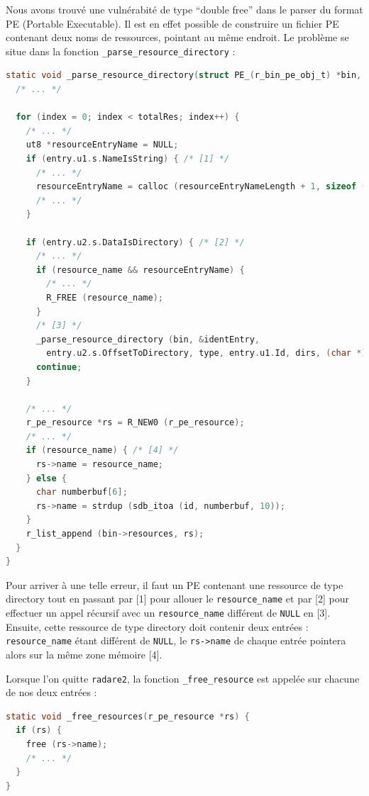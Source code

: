 Nous avons trouvé une vulnérabité de type ``double free'' dans le parser du format PE (Portable Executable). Il est en effet possible de construire un fichier PE contenant deux noms de ressources, pointant au même endroit. Le problème se situe dans la fonction \lstinline{_parse_resource_directory} :

\begin{lstlisting}[language=C]
static void _parse_resource_directory(struct PE_(r_bin_pe_obj_t) *bin, Pe_image_resource_directory *dir, ut64 offDir, int type, int id, HtUU *dirs, char *resource_name) {
  /* ... */

  for (index = 0; index < totalRes; index++) {
    /* ... */
    ut8 *resourceEntryName = NULL;
    if (entry.u1.s.NameIsString) { /* [1] */
      /* ... */
      resourceEntryName = calloc (resourceEntryNameLength + 1, sizeof (ut8));
      /* ... */
    }

    if (entry.u2.s.DataIsDirectory) { /* [2] */
      /* ... */
      if (resource_name && resourceEntryName) {
        /* ... */
        R_FREE (resource_name);
      }
      /* [3] */
      _parse_resource_directory (bin, &identEntry,
        entry.u2.s.OffsetToDirectory, type, entry.u1.Id, dirs, (char *)resourceEntryName);
      continue;
    }

    /* ... */
    r_pe_resource *rs = R_NEW0 (r_pe_resource);
    /* ... */
    if (resource_name) { /* [4] */
      rs->name = resource_name;
    } else {
      char numberbuf[6];
      rs->name = strdup (sdb_itoa (id, numberbuf, 10));
    }
    r_list_append (bin->resources, rs);
  }
}
\end{lstlisting}

Pour arriver à une telle erreur, il faut un PE contenant une ressource de type directory tout en passant par [1] pour allouer le \lstinline{resource_name} et par [2] pour effectuer un appel récursif avec un \lstinline{resource_name} différent de \lstinline{NULL} en [3].
Ensuite, cette ressource de type directory doit contenir deux entrées : \lstinline{resource_name} étant différent de \lstinline{NULL}, le \lstinline{rs->name} de chaque entrée pointera alors sur la même zone mémoire [4].

Lorsque l'on quitte \lstinline{radare2}, la fonction \lstinline{_free_resource} est appelée sur chacune de nos deux entrées :

\begin{lstlisting}[language=C]
static void _free_resources(r_pe_resource *rs) {
  if (rs) {
    free (rs->name);
    /* ... */
  }
}
\end{lstlisting}

